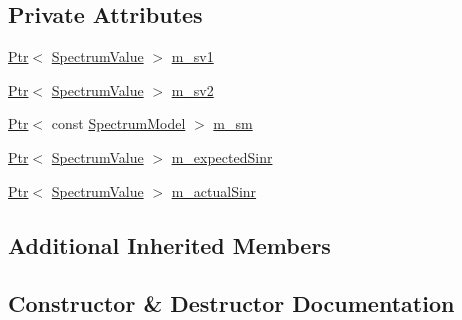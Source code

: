 \subsection*{Private Attributes}
\begin{DoxyCompactItemize}
\item 
\hyperlink{classns3_1_1Ptr}{Ptr}$<$ \hyperlink{classns3_1_1SpectrumValue}{Spectrum\+Value} $>$ \hyperlink{classLteUplinkSrsSinrTestCase_afab98b3888ccdb42ed33f951ceaa1812}{m\+\_\+sv1}
\item 
\hyperlink{classns3_1_1Ptr}{Ptr}$<$ \hyperlink{classns3_1_1SpectrumValue}{Spectrum\+Value} $>$ \hyperlink{classLteUplinkSrsSinrTestCase_ac2211e582f2eb062664fbdc6979e12d4}{m\+\_\+sv2}
\item 
\hyperlink{classns3_1_1Ptr}{Ptr}$<$ const \hyperlink{classns3_1_1SpectrumModel}{Spectrum\+Model} $>$ \hyperlink{classLteUplinkSrsSinrTestCase_aa5071a03e01428f289066683345609a3}{m\+\_\+sm}
\item 
\hyperlink{classns3_1_1Ptr}{Ptr}$<$ \hyperlink{classns3_1_1SpectrumValue}{Spectrum\+Value} $>$ \hyperlink{classLteUplinkSrsSinrTestCase_aa70bf173e293941357c8fdb32a0b403c}{m\+\_\+expected\+Sinr}
\item 
\hyperlink{classns3_1_1Ptr}{Ptr}$<$ \hyperlink{classns3_1_1SpectrumValue}{Spectrum\+Value} $>$ \hyperlink{classLteUplinkSrsSinrTestCase_a4598a42aea09e59348362789f51e564e}{m\+\_\+actual\+Sinr}
\end{DoxyCompactItemize}
\subsection*{Additional Inherited Members}


\subsection{Constructor \& Destructor Documentation}
